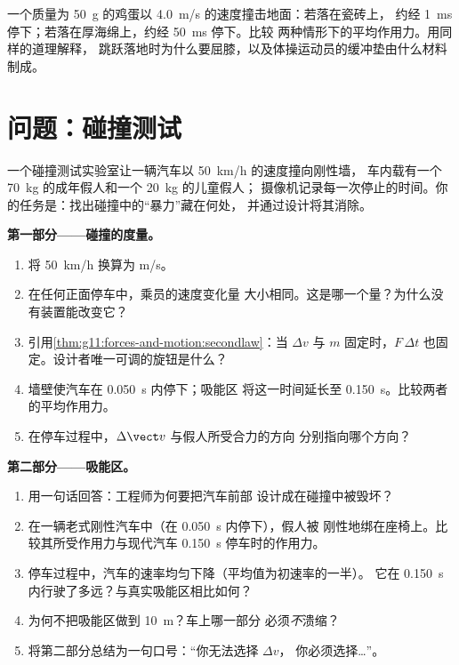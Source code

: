 \begin{exercise}[$\star\star\star$]\label{exo:g11:forces-and-motion:15}
一个质量为 \qty{50}{g} 的鸡蛋以 \qty{4.0}{m/s} 的速度撞击地面：若落在瓷砖上，
约经 \qty{1}{ms} 停下；若落在厚海绵上，约经 \qty{50}{ms} 停下。比较
两种情形下的平均作用力。用同样的道理解释，
跳跃落地时为什么要屈膝，以及体操运动员的缓冲垫由什么材料制成。
\end{exercise}

\section{问题：碰撞测试}

\begin{problem}
\label{pb:g11:forces-and-motion:1}
一个碰撞测试实验室让一辆汽车以 \qty{50}{km/h} 的速度撞向刚性墙，
车内载有一个 \qty{70}{kg} 的成年假人和一个 \qty{20}{kg} 的儿童假人；
摄像机记录每一次停止的时间。你的任务是：找出碰撞中的“暴力”藏在何处，
并通过设计将其消除。

\medskip
\noindent\textbf{第一部分——碰撞的度量。}
\begin{enumerate}
  \item 将 \qty{50}{km/h} 换算为 \unit{m/s}。
  \item 在任何正面停车中，乘员的速度变化量
        大小相同。这是哪一个量？为什么没有装置能改变它？
  \item 引用\cref{thm:g11:forces-and-motion:secondlaw}：当 $\Delta v$
        与 $m$ 固定时，$F\,\Delta t$ 也固定。设计者唯一可调的旋钮是什么？
  \item 墙壁使汽车在 \qty{0.050}{s} 内停下；吸能区
        将这一时间延长至 \qty{0.150}{s}。比较两者的平均作用力。
  \item 在停车过程中，$\Delta \vect v$ 与假人所受合力的方向
        分别指向哪个方向？
\end{enumerate}

\medskip
\noindent\textbf{第二部分——吸能区。}
\begin{enumerate}[resume]
  \item 用一句话回答：工程师为何要把汽车前部
        设计成在碰撞中被毁坏？
  \item 在一辆老式刚性汽车中（在 \qty{0.050}{s} 内停下），假人被
        刚性地绑在座椅上。比较其所受作用力与现代汽车 \qty{0.150}{s} 停车时的作用力。
  \item 停车过程中，汽车的速率均匀下降（平均值为初速率的一半）。
        它在 \qty{0.150}{s} 内行驶了多远？与真实吸能区相比如何？
  \item 为何不把吸能区做到 \qty{10}{m}？车上哪一部分
        必须\emph{不}溃缩？
  \item 将第二部分总结为一句口号：“你无法选择 $\Delta v$，
        你必须选择\dots”。
\end{enumerate}


\end{problem}
